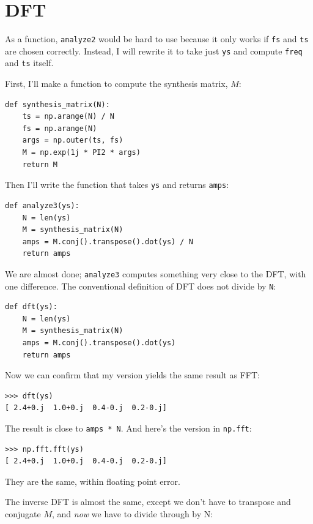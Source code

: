 \documentclass[12pt]{book}
\begin{document}
\section{DFT}
\label{dftsection}

As a function, {\tt analyze2} would be hard to use because it
only works if {\tt fs} and {\tt ts} are chosen correctly.
Instead, I will rewrite it to take just {\tt ys} and compute {\tt freq}
and {\tt ts} itself.

First, I'll make a function to compute the synthesis matrix, $M$:

\begin{verbatim}
def synthesis_matrix(N):
    ts = np.arange(N) / N
    fs = np.arange(N)
    args = np.outer(ts, fs)
    M = np.exp(1j * PI2 * args)
    return M
\end{verbatim}

Then I'll write the function that takes {\tt ys} and returns 
{\tt amps}:

\begin{verbatim}
def analyze3(ys):
    N = len(ys)
    M = synthesis_matrix(N)
    amps = M.conj().transpose().dot(ys) / N
    return amps
\end{verbatim}

We are almost done; {\tt analyze3} computes something very
close to the DFT, with one difference.  The conventional definition
of DFT does not divide by {\tt N}:

\begin{verbatim}
def dft(ys):
    N = len(ys)
    M = synthesis_matrix(N)
    amps = M.conj().transpose().dot(ys)
    return amps
\end{verbatim}

Now we can confirm that my version yields the same result as
FFT:

\begin{verbatim}
>>> dft(ys)
[ 2.4+0.j  1.0+0.j  0.4-0.j  0.2-0.j]
\end{verbatim}

The result is close to {\tt amps * N}.
And here's the version in {\tt np.fft}:

\begin{verbatim}
>>> np.fft.fft(ys)
[ 2.4+0.j  1.0+0.j  0.4-0.j  0.2-0.j]
\end{verbatim}

They are the same, within floating point error.

The inverse DFT is almost the same, except we don't have to transpose
and conjugate $M$, and {\em now} we have to divide through by N:
\end{document}
